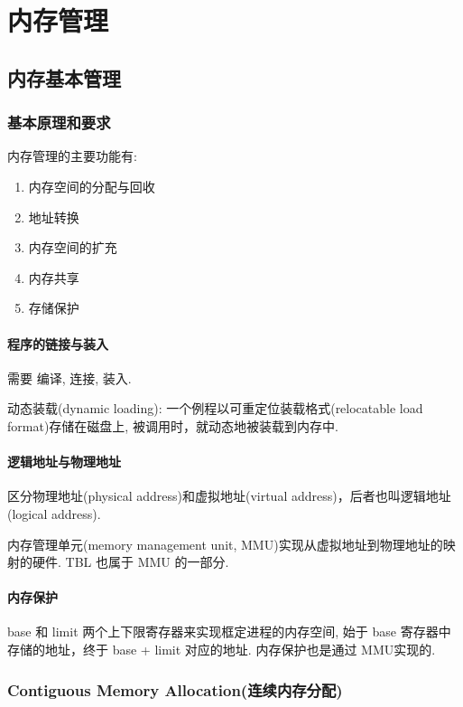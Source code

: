 \section{内存管理}
\subsection{内存基本管理}

\subsubsection{基本原理和要求}
内存管理的主要功能有:
\begin{enumerate}
    \item 内存空间的分配与回收
    \item 地址转换
    \item 内存空间的扩充
    \item 内存共享
    \item 存储保护
\end{enumerate}

\paragraph{程序的链接与装入}需要 编译, 连接, 装入. 

动态装载(dynamic loading): 一个例程以可重定位装载格式(relocatable load format)存储在磁盘上, 被调用时，就动态地被装载到内存中. 

\paragraph{逻辑地址与物理地址}区分物理地址(physical address)和虚拟地址(virtual address)，后者也叫逻辑地址(logical address). 

内存管理单元(memory management unit, MMU)实现从虚拟地址到物理地址的映射的硬件. TBL 也属于 MMU 的一部分. 

\paragraph{内存保护}base 和 limit 两个上下限寄存器来实现框定进程的内存空间, 始于 base 寄存器中存储的地址，终于 base + limit 对应的地址. 内存保护也是通过 MMU实现的. 

\subsubsection{Contiguous Memory Allocation(连续内存分配)}


